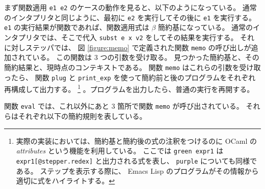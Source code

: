 まず関数適用 \texttt{e1 e2} のケースの動作を見ると、以下のようになっている。
通常のインタプリタと同じように、最初に \texttt{e2} を実行してその後に \texttt{e1} を実行する。
\texttt{e1} の実行結果が関数であれば、関数適用式は $\beta$ 簡約基になっている。
通常のインタプリタでは、そこで代入 \texttt{subst e x v2} をしてその結果を実行する。
それに対しステッパでは、
図 \ref{figure:memo} で定義された関数 \texttt{memo} の呼び出しが追加されている。
この関数は 3 つの引数を受け取る。
見つかった簡約基と、その簡約結果と、現時点のコンテキストである。
関数 \texttt{memo} はこれらの引数を受け取ったら、
関数 \texttt{plug} と \texttt{print\_exp} を使って簡約前と後のプログラムをそれぞれ再構成して出力する。
\footnote{
    実際の実装においては、簡約基と簡約後の式の注釈をつけるのに
    OCaml の \emph{attributes} という機能を利用している。
    ここでは \texttt{green expr1} は \texttt{expr1[@stepper.redex]} と出力される式を表し、
    \texttt{purple} についても同様である。
    ステップを表示する際に、 Emacs Lisp のプログラムがその情報から
    適切に式をハイライトする。
    }
    。プログラムを出力したら、普通の実行を再開する。

関数 \texttt{eval} では、これ以外にあと 3 箇所で関数 \texttt{memo} が呼び出されている。
それらはそれぞれ以下の簡約規則を表している。

